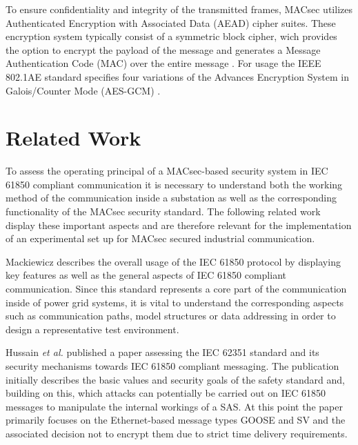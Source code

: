 \documentclass[conference]{IEEEtran}
\begin{document}
\smallskip
To ensure confidentiality and integrity of the transmitted frames, MACsec utilizes Authenticated Encryption with Associated Data (AEAD) cipher suites. 
These encryption system typically consist of a symmetric block cipher, wich provides the option to encrypt the payload of the message and generates a 
Message Authentication Code (MAC) over the entire message \cite{GOOSE_confidentiality_integrity:2020}. For usage the IEEE 802.1AE standard specifies 
four variations of the Advances Encryption System in Galois/Counter Mode (AES-GCM) \cite[p. 143ff]{IEEE-802-1AE:2018}.

\section{Related Work}
\label{chapter:relatedWork}
\noindent To assess the operating principal of a MACsec-based security system in IEC 61850 compliant communication it is necessary to understand both 
the working method of the communication inside a substation as well as the corresponding functionality of the MACsec security standard. The following 
related work display these important aspects and are therefore relevant for the implementation of an experimental set up for MACsec secured industrial 
communication.

\smallskip
Mackiewicz \cite{IEC61850_Overview:2006} describes the overall usage of the IEC 61850 protocol by displaying key features as well as the general aspects 
of IEC 61850 compliant communication. Since this standard represents a core part of the communication inside of power grid systems, it is vital to 
understand the corresponding aspects such as communication paths, model structures or data addressing in order to design a representative test environment. 

\smallskip
Hussain  \textit{et al.} \cite{Review_IEC62351:2019} published a paper assessing the IEC 62351 standard and its security mechanisms towards IEC 61850 
compliant messaging. The publication initially describes the basic values and security goals of the safety standard and, building on this, which attacks 
can potentially be carried out on IEC 61850 messages to manipulate the internal workings of a SAS. At this point the paper primarily focuses on the 
Ethernet-based message types GOOSE and SV and the associated decision not to encrypt them due to strict time delivery requirements.  
\end{document}
